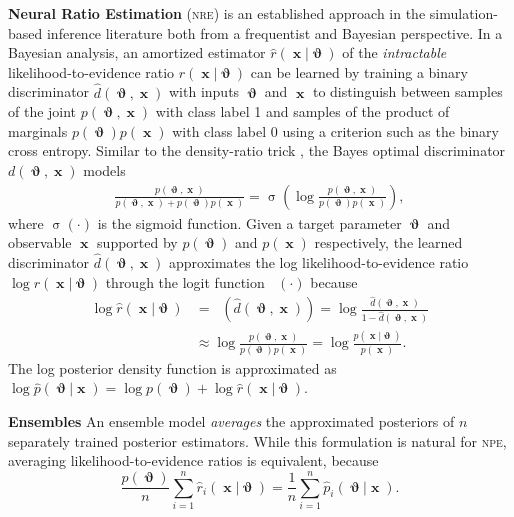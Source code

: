 \documentclass[twoside]{article}
\DeclareMathOperator{\logit}{\sigma^{-1}}
\DeclareMathOperator{\sigmoid}{\sigma}
\DeclareMathOperator{\vtheta}{\boldsymbol\vartheta}
\DeclareMathOperator{\vx}{\boldsymbol x}
\newcommand{\nre}{\textsc{nre}}
\begin{document}
{\bf Neural Ratio Estimation} (\nre) is an established approach in the simulation-based inference literature both from a frequentist \citep{cranmer2015approximating} and Bayesian \citep{thomas2016likelihood,2019arXiv190304057H} perspective. In a Bayesian analysis, 
an amortized estimator $\hat{r}(\vx\vert\vtheta)$
of the \emph{intractable} likelihood-to-evidence ratio $r(\vx\vert\vtheta)$ can be learned by training a binary discriminator $\hat{d}(\vtheta,\vx)$ with inputs $\vtheta$ and $\vx$ to distinguish between samples of the
joint $p(\vtheta,\vx)$ with class label 1 and samples of the product of marginals $p(\vtheta)p(\vx)$ with class label 0 using a criterion such
as the binary cross entropy. Similar to the density-ratio trick \citep{sugiyama2012density,goodfellow2014generative,cranmer2015approximating,2019arXiv190304057H}, the Bayes optimal discriminator $d(\vtheta,\vx)$ models
\begin{align}
  \frac{p(\vtheta, \vx)}{p(\vtheta,\vx) + p(\vtheta)p(\vx)} = \sigmoid\left(\log\frac{p(\vtheta,\vx)}{p(\vtheta)p(\vx)}\right),
\end{align}
where $\sigmoid(\cdot)$ is the sigmoid function.
Given a target parameter $\vtheta$ and observable $\vx$ supported by $p(\vtheta)$ and $p(\vx)$ respectively,
the learned discriminator $\hat{d}(\vtheta,\vx)$ approximates the log likelihood-to-evidence ratio $\log r(\vx\vert\vtheta)$ through the logit function $\logit(\cdot)$ because
\begin{align}
  \log \hat{r}(\vx\vert\vtheta) &= \logit\left(\hat{d}(\vtheta,\vx)\right) = \log\frac{\hat{d}(\vtheta,\vx)}{1 - \hat{d}(\vtheta,\vx)}\\ 
  &\approx \log\frac{p(\vtheta, \vx)}{p(\vtheta)p(\vx)} = \log\frac{p(\vx\vert\vtheta)}{p(\vx)}.
\end{align}
The log posterior density function is approximated as $\log \hat{p}(\vtheta\vert\vx) = \log p(\vtheta) + \log \hat{r}(\vx\vert\vtheta)$.

{\bf Ensembles} An ensemble model \emph{averages} the approximated posteriors of $n$ separately trained posterior estimators. While this formulation is natural for \textsc{npe}, averaging likelihood-to-evidence ratios is equivalent, because
\begin{equation}
    \frac{p(\vtheta)}{n} \sum_{i=1}^n \hat{r}_i(\vx \vert \vtheta) = \frac{1}{n}\sum_{i=1}^n \hat{p}_i(\vtheta \vert \vx).
\end{equation}
\end{document}
